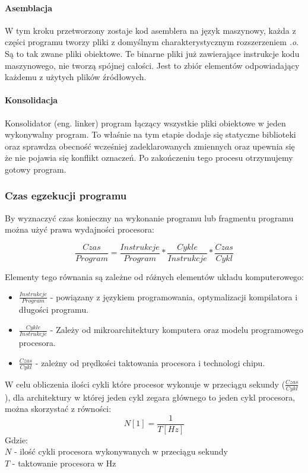 \documentclass[a4paper,12pt]{article}
\begin{document}
\paragraph{Asemblacja}

W tym kroku przetworzony zostaje kod asemblera na język maszynowy, każda z części programu tworzy pliki z domyślnym charakterystycznym rozszerzeniem \textit{.o}.
Są to tak zwane pliki obiektowe.
Te binarne pliki już zawierające instrukcje kodu maszynowego, nie tworzą spójnej całości. Jest to zbiór elementów odpowiadający każdemu z użytych plików źródłowych.

\paragraph{Konsolidacja}
Konsolidator (eng. linker) program łączący wszystkie pliki obiektowe w jeden wykonywalny program. To właśnie na tym etapie dodaje się statyczne biblioteki oraz sprawdza obecność wcześniej zadeklarowanych zmiennych oraz upewnia się że nie pojawia się konflikt oznaczeń. Po zakończeniu tego procesu otrzymujemy gotowy program. 


\subsubsection{Czas egzekucji programu}

By wyznaczyć czas konieczny na wykonanie programu lub fragmentu programu można użyć prawa wydajności procesora:

\begin{equation}
        \label{Iron Law}
        \frac{Czas}{Program} =  \frac{Instrukcje}{Program} * \frac{Cykle}{Instrukcje} * \frac{Czas}{Cykl}
\end{equation}

Elementy tego równania są zależne od różnych elementów układu komputerowego:
\begin{itemize}
        \item $\frac{Instrukcje}{Program}$ - powiązany z językiem programowania, optymalizacji kompilatora i długości programu. 
        \item $\frac{Cykle}{Instrukcje}$ - Zależy od mikroarchitektury komputera oraz modelu programowego procesora.
        \item $\frac{Czas}{Cykl}$ -  zależny od prędkości taktowania procesora i technologi chipu. 
\end{itemize} 


W celu obliczenia ilości cykli które procesor wykonuje w przeciągu sekundy ($\frac{Czas}{Cykl}$), dla architektury w której jeden cykl zegara głównego to jeden cykl procesora, można skorzystać z równości:
\begin{equation}
        \label{Cykli w sec}
        N [1]= \frac{1}{T [Hz]}
\end{equation} 
Gdzie:\\
$N$ - ilość cykli procesora wykonywanych w przeciągu sekundy \\
$T$ - taktowanie procesora w Hz
\end{document}
